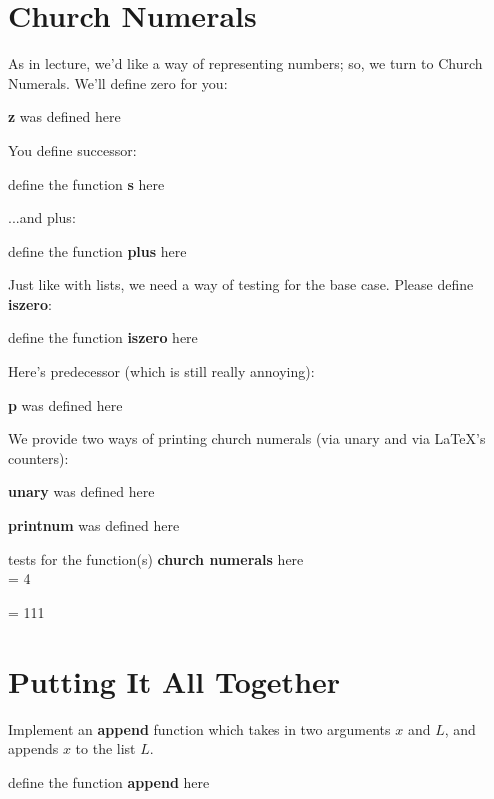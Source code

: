 \documentclass{article}
\newcommand{\op}[1]{\textbf{#1}}
\newcommand{\begintodo}[1]{\begin{center}define the function \op{#1} here\end{center}}
\newcommand{\begindone}[1]{\begin{center}\op{#1} was defined here\end{center}}
\newcommand{\finishtodo}[1]{}
\newcommand{\finishdone}[1]{}
\newcommand{\test}[2]{#1 = #2\par}
\newcommand{\begintests}[1]{\begin{center}tests for the function(s) \op{#1} here\\}
\newcommand{\finishtests}[1]{\end{center}}
\begin{document}
\section{Church Numerals}
As in lecture, we'd like a way of representing numbers; so, we turn to Church Numerals.  We'll
define zero for you:

\begindone{z}
\newcommand{\z}[1]{\id}
\finishdone{z}

You define successor:

\begintodo{s}
\newcommand{\s}[3]{#2{#1{#2}{#3}}}
\finishtodo{s}

...and plus:

\begintodo{plus}
\newcommand{\plus}[4]{#1{#3}{#2{#3}{#4}}}
\finishtodo{plus}

Just like with lists, we need a way of testing for the base case.  Please define
\op{iszero}:

\begintodo{iszero}
\newcommand{\helptwo}[1]{\false}
\newcommand{\iszero}[1]{#1{\helptwo}{\true}}
\finishtodo{iszero}

Here's predecessor (which is still really annoying):

\begindone{p}
\newcommand{\phelpa}[3]{#3{#2{#1}}}
\newcommand{\phelpb}[2]{#1}
\newcommand{\p}[3]{#1{\phelpa{#2}}{\phelpb{#3}}{\id}}
\finishdone{p}

We provide two ways of printing church numerals (via unary and via \LaTeX's
counters):

\begindone{unary}
\newcommand{\recUnary}[2]{\ifthenelse{\iszero{#2}}{}{1{#1 {\p{#2}}}}}
\newcommand{\unary}[1]{\Y{\recUnary}{#1}}
\finishdone{unary}

\begindone{printnum}
\newcommand{\recPrintNum}[2]{\ifthenelse{\iszero{#2}}{}{\addtocounter{num}{1}{#1{\p{#2}}}}}
\newcommand{\printnum}[1]{\setcounter{num}{0}{\Y{\recPrintNum}{#1}}}
\finishdone{printnum}

\begintests{church numerals}
\test{\printnum{\s{\s{\s{\s{\z}}}}}}{4}
\test{\unary{\plus{\s{\z}}{\s{\s{\z}}}}}{111}
\finishtests{church numerals}

\section{Putting It All Together}
Implement an \op{append} function which takes in two arguments $x$ and $L$, and appends $x$ to the list $L$.

\begintodo{append}
\newcommand{\helpfour}[3]{\ifthenelse
        {\isempty{#3}}
        {\cons{#2}{#3}}
        {\cons{\car{#3}}{#1{#2}{\cdr{#3}}}}
    }
\newcommand{\append}[2]{\Y{\helpfour}{#1}{#2}}
\finishtodo{append}
\end{document}
